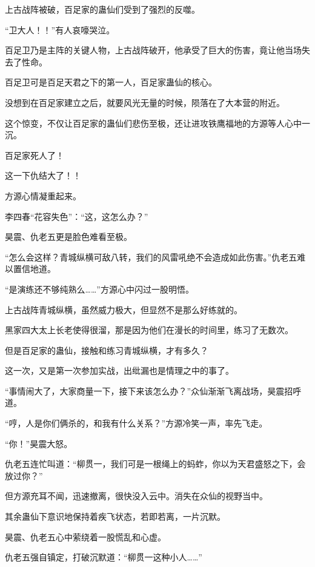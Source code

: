 
\begin{this_body}



上古战阵被破，百足家的蛊仙们受到了强烈的反噬。

“卫大人！！”有人哀嚎哭泣。

百足卫乃是主阵的关键人物，上古战阵破开，他承受了巨大的伤害，竟让他当场失去了性命。

百足卫可是百足天君之下的第一人，百足家蛊仙的核心。

没想到在百足家建立之后，就要风光无量的时候，陨落在了大本营的附近。

这个惊变，不仅让百足家的蛊仙们悲伤至极，还让进攻铁鹰福地的方源等人心中一沉。

百足家死人了！

这一下仇结大了！！

方源心情凝重起来。

李四春“花容失色”：“这，这怎么办？”

昊震、仇老五更是脸色难看至极。

“怎么会这样？青城纵横可敌八转，我们的风雷吼绝不会造成如此伤害。”仇老五难以置信地道。

“是演练还不够纯熟么……”方源心中闪过一股明悟。

上古战阵青城纵横，虽然威力极大，但显然不是那么好练就的。

黑家四大太上长老使得很溜，那是因为他们在漫长的时间里，练习了无数次。

但是百足家的蛊仙，接触和练习青城纵横，才有多久？

这一次，又是第一次参加实战，出纰漏也是情理之中的事了。

“事情闹大了，大家商量一下，接下来该怎么办？”众仙渐渐飞离战场，昊震招呼道。

“哼，人是你们俩杀的，和我有什么关系？”方源冷笑一声，率先飞走。

“你！”昊震大怒。

仇老五连忙叫道：“柳贯一，我们可是一根绳上的蚂蚱，你以为天君盛怒之下，会放过你？”

但方源充耳不闻，迅速撤离，很快没入云中。消失在众仙的视野当中。

其余蛊仙下意识地保持着疾飞状态，若即若离，一片沉默。

昊震、仇老五心中萦绕着一股慌乱和心虚。

仇老五强自镇定，打破沉默道：“柳贯一这种小人……”


\end{this_body}
